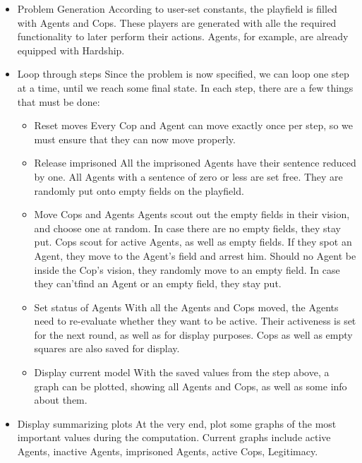 \documentclass[11pt]{article}
\begin{document}
\begin{itemize}
\item Problem Generation\newline
According to user-set constants, the playfield is filled with Agents and Cops. These players are generated with alle the required functionality to later perform their actions. Agents, for example, are already equipped with Hardship.
\item Loop through steps\newline
Since the problem is now specified, we can loop one step at a time, until we reach some final state. In each step, there are a few things that must be done:
\begin{itemize}
\item Reset moves\newline
Every Cop and Agent can move exactly once per step, so we must ensure that they can now move properly.
\item Release imprisoned\newline
All the imprisoned Agents have their sentence reduced by one. All Agents with a sentence of zero or less are set free. They are randomly put onto empty fields on the playfield.
\item Move Cops and Agents\newline
Agents scout out the empty fields in their vision, and choose one at random. In case there are no empty fields, they stay put.\newline
Cops scout for active Agents, as well as empty fields. If they spot an Agent, they move to the Agent's field and arrest him. Should no Agent be inside the Cop's vision, they randomly move to an empty field. In case they can'tfind an Agent or an empty field, they stay put.
\item Set status of Agents\newline
With all the Agents and Cops moved, the Agents need to re-evaluate whether they want to be active. Their activeness is set for the next round, as well as for display purposes. Cops as well as empty squares are also saved for display.
\item Display current model\newline
With the saved values from the step above, a graph can be plotted, showing all Agents and Cops, as well as some info about them.
\end{itemize}
\item Display summarizing plots\newline
At the very end, plot some graphs of the most important values during the computation. Current graphs include active Agents, inactive Agents, imprisoned Agents, active Cops, Legitimacy.
\end{itemize}
\end{document}
